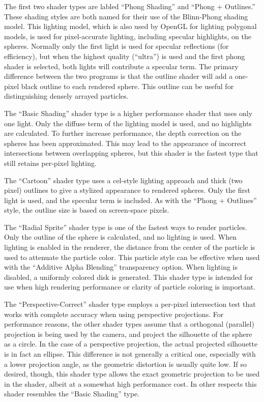 The first two shader types are labled ``Phong Shading'' and ``Phong + Outlines.''  These shading styles are both named for their use of the Blinn-Phong shading model.  This lighting model, which is also used by OpenGL for lighting polygonal models, is used for pixel-accurate lighting, including specular highlights, on the spheres.  Normally only the first light is used for specular reflections (for efficiency), but when the highest quality (``ultra'') is used and the first phong shader is selected, both lights will contribute a specular term.  The primary difference between the two programs is that the outline shader will add a one-pixel black outline to each rendered sphere.  This outline can be useful for distinguishing densely arrayed particles.

The ``Basic Shading'' shader type is a higher performance shader that uses only one light.  Only the diffuse term of the lighting model is used, and no highlights are calculated.  To further increase performance, the depth correction on the spheres has been approximated.  This may lead to the appearance of incorrect intersections between overlapping spheres, but this shader is the fastest type that still retains per-pixel lighting.

The ``Cartoon'' shader type uses a cel-style lighting approach and thick (two pixel) outlines to give a stylized appearance to rendered spheres.  Only the first light is used, and the specular term is included.  As with the ``Phong + Outlines'' style, the outline size is based on screen-space pixels.

The ``Radial Sprite'' shader type is one of the fastest ways to render particles.  Only the outline of the sphere is calculated, and no lighting is used.  When lighting is enabled in the renderer, the distance from the center of the particle is used to attenuate the particle color.  This particle style can be effective when used with the ``Additive Alpha Blending'' transparency option.  When lighting is disabled, a uniformly colored disk is generated.  This shader type is intended for use when high rendering performance or clarity of particle coloring is important.

The ``Perspective-Correct'' shader type employs a per-pixel intersection test that works with complete accuracy when using perspective projections.  For performance reasons, the other shader types assume that a orthogonal (parallel) projection is being used by the camera, and project the silhouette of the sphere as a circle.  In the case of a perspective projection, the actual projected silhouette is in fact an ellipse.  This difference is not generally a critical one, especially with a lower projection angle, as the geometric distortion is usually quite low.  If so desired, though, this shader type allows the exact geometric projection to be used in the shader, albeit at a somewhat high performance cost.  In other respects this shader resembles the ``Basic Shading'' type.

